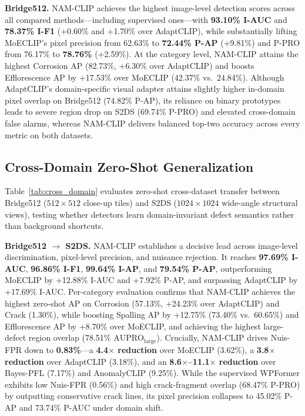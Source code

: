 \documentclass[conference]{IEEEtran}
\newcommand{\method}{NAM-CLIP}
\begin{document}
\textbf{Bridge512.} \method{} achieves the highest image-level detection scores across all compared methods---including supervised ones---with \textbf{93.10\% I-AUC} and \textbf{78.37\% I-F1} (+0.60\% and +1.70\% over AdaptCLIP), while substantially lifting MoECLIP's pixel precision from 62.63\% to \textbf{72.44\% P-AP} (+9.81\%) and P-PRO from 76.17\% to \textbf{78.76\%} (+2.59\%). At the category level, \method{} attains the highest Corrosion AP (82.73\%, +6.30\% over AdaptCLIP) and boosts Efflorescence AP by +17.53\% over MoECLIP (42.37\% vs.\ 24.84\%). Although AdaptCLIP's domain-specific visual adapter attains slightly higher in-domain pixel overlap on Bridge512 (74.82\% P-AP), its reliance on binary prototypes leads to severe region drop on S2DS (69.74\% P-PRO) and elevated cross-domain false alarms, whereas \method{} delivers balanced top-two accuracy across every metric on both datasets.

\subsection{Cross-Domain Zero-Shot Generalization}

Table~\ref{tab:cross_domain} evaluates zero-shot cross-dataset transfer between Bridge512 ($512{\times}512$ close-up tiles) and S2DS ($1024{\times}1024$ wide-angle structural views), testing whether detectors learn domain-invariant defect semantics rather than background shortcuts.

\textbf{Bridge512 $\rightarrow$ S2DS.} \method{} establishes a decisive lead across image-level discrimination, pixel-level precision, and nuisance rejection. It reaches \textbf{97.69\% I-AUC}, \textbf{96.86\% I-F1}, \textbf{99.64\% I-AP}, and \textbf{79.54\% P-AP}, outperforming MoECLIP by +12.88\% I-AUC and +7.92\% P-AP, and surpassing AdaptCLIP by +17.69\% I-AUC. Per-category evaluation confirms that \method{} achieves the highest zero-shot AP on Corrosion (57.13\%, +24.23\% over AdaptCLIP) and Crack (1.30\%), while boosting Spalling AP by +12.75\% (73.40\% vs.\ 60.65\%) and Efflorescence AP by +8.70\% over MoECLIP, and achieving the highest large-defect region overlap (78.51\% $\mathrm{AUPRO}_{\mathrm{large}}$). Crucially, \method{} drives Nuis-FPR down to \textbf{0.83\%}---a \textbf{4.4$\times$ reduction} over MoECLIP (3.62\%), a \textbf{3.8$\times$ reduction} over AdaptCLIP (3.18\%), and an \textbf{8.6$\times$--11.1$\times$ reduction} over Bayes-PFL (7.17\%) and AnomalyCLIP (9.25\%). While the supervised WPFormer exhibits low Nuis-FPR (0.56\%) and high crack-fragment overlap (68.47\% P-PRO) by outputting conservative crack lines, its pixel precision collapses to 45.02\% P-AP and 73.74\% P-AUC under domain shift.
\end{document}
